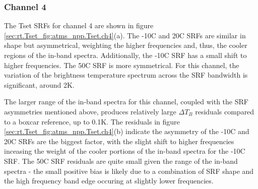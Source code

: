\subsubsection{Channel 4}
The Tset SRFs for channel 4 are shown in figure \ref{sec:rt.Tset_fig:atms_npp.Tset.ch4}(a). The -10\textdegree{}C and 20\textdegree{}C SRFs are similar in shape but asymmetrical, weighting the higher frequencies and, thus, the cooler regions of the in-band spectra. Additionally, the -10\textdegree{}C SRF has a small shift to higher frequencies. The 50\textdegree{}C SRF is more symmetrical. For this channel, the variation of the brightness temperature spectrum across the SRF bandwidth is significant, around 2K.

The larger range of the in-band spectra for this channel, coupled with the SRF asymmetries mentioned above, produces relatively large $\Delta T_B$ residuals compared to a boxcar reference, up to 0.1K. The residuals in figure \ref{sec:rt.Tset_fig:atms_npp.Tset.ch4}(b) indicate the asymmetry of the -10\textdegree{}C and 20\textdegree{}C SRFs are the biggest factor, with the slight shift to higher frequencies inceasing the weight of the cooler portions of the in-band spectra for the -10\textdegree{}C SRF. The 50\textdegree{}C SRF residuals are quite small given the range of the in-band spectra - the small positive bias is likely due to a combination of SRF shape and the high frequency band edge occuring at slightly lower frequencies. 
